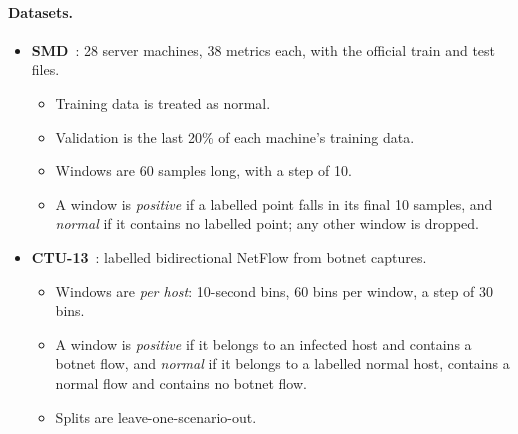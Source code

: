 \paragraph{Datasets.}
\begin{itemize}
  \item \textbf{SMD}~\cite{su2019smd}: 28 server machines, 38 metrics each, with the official train and test files.
    \begin{itemize}
      \item Training data is treated as normal.
      \item Validation is the last 20\% of each machine's training data.
      \item Windows are 60 samples long, with a step of 10.
      \item A window is \emph{positive} if a labelled point falls in its final 10 samples, and \emph{normal} if it contains no labelled point; any other window is dropped.
    \end{itemize}
  \item \textbf{CTU-13}~\cite{garcia2014ctu}: labelled bidirectional NetFlow from botnet captures.
    \begin{itemize}
      \item Windows are \emph{per host}: 10-second bins, 60 bins per window, a step of 30 bins.
      \item A window is \emph{positive} if it belongs to an infected host and contains a botnet flow, and \emph{normal} if it belongs to a labelled normal host, contains a normal flow and contains no botnet flow.
      \item Splits are leave-one-scenario-out.
    \end{itemize}
\end{itemize}

